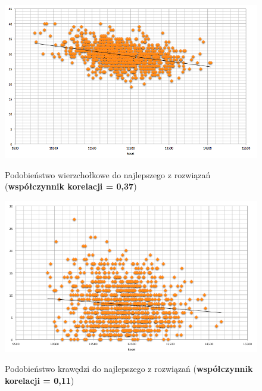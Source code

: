 \documentclass[a4paper 10pt]{article}
\begin{document}
\begin{figure} [H]
\centering
\caption{Podobieństwo wierzchołkowe do najlepszego z rozwiązań (\textbf{współczynnik korelacji = 0,37})}
\includegraphics[angle=0,width = 1\textwidth, height=!]{images/node_best.png}
\label{Rys. Edges}
\end{figure}

\begin{figure} [H]
\centering
\caption{Podobieństwo krawędzi do najlepszego z rozwiązań (\textbf{współczynnik korelacji = 0,11})}
\includegraphics[angle=0,width = 1\textwidth, height=!]{images/edge_best.png}
\label{Rys. Edges}
\end{figure}
\end{document}

